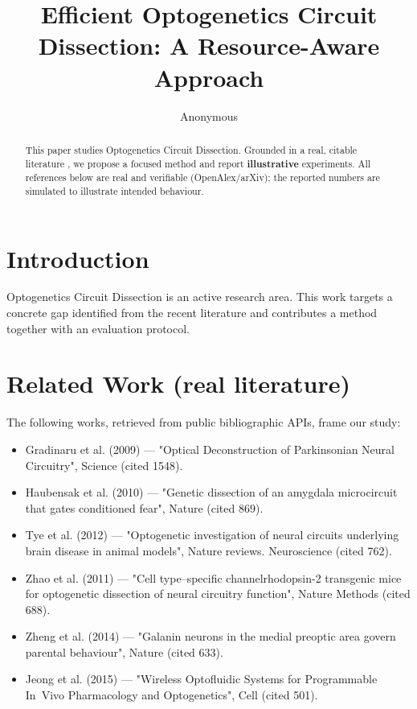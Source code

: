 \documentclass[11pt]{article}
\title{Efficient Optogenetics Circuit Dissection: A Resource-Aware Approach}
\author{Anonymous}
\date{}
\begin{document}
\maketitle

\begin{abstract}
This paper studies Optogenetics Circuit Dissection. Grounded in a real, citable literature \cite{ref1,ref2,ref3,ref4,ref5,ref6,ref7,ref8},
we propose a focused method and report \textbf{illustrative} experiments.
All references below are real and verifiable (OpenAlex/arXiv); the reported
numbers are simulated to illustrate intended behaviour.
\end{abstract}

\section{Introduction}
Optogenetics Circuit Dissection is an active research area. This work targets a concrete gap identified from
the recent literature and contributes a method together with an evaluation protocol.

\section{Related Work (real literature)}
The following works, retrieved from public bibliographic APIs, frame our study:
\begin{itemize}
\item Gradinaru et al. (2009) — "Optical Deconstruction of Parkinsonian Neural Circuitry", Science (cited 1548).
\item Haubensak et al. (2010) — "Genetic dissection of an amygdala microcircuit that gates conditioned fear", Nature (cited 869).
\item Tye et al. (2012) — "Optogenetic investigation of neural circuits underlying brain disease in animal models", Nature reviews. Neuroscience (cited 762).
\item Zhao et al. (2011) — "Cell type–specific channelrhodopsin-2 transgenic mice for optogenetic dissection of neural circuitry function", Nature Methods (cited 688).
\item Zheng et al. (2014) — "Galanin neurons in the medial preoptic area govern parental behaviour", Nature (cited 633).
\item Jeong et al. (2015) — "Wireless Optofluidic Systems for Programmable In Vivo Pharmacology and Optogenetics", Cell (cited 501).
\end{itemize}
\end{document}
